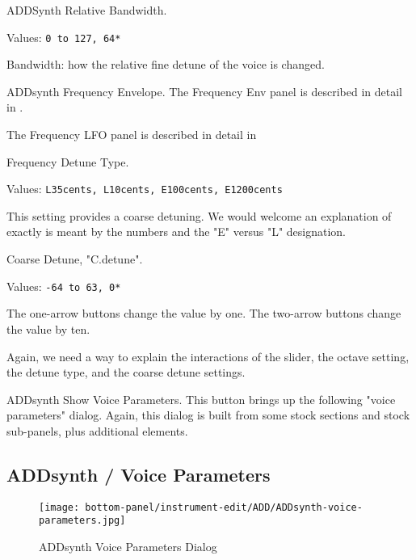    ADDSynth Relative Bandwidth.

   Values: \texttt{0 to 127, 64*}

   Bandwidth: how the relative fine detune of the voice is changed.

   ADDsynth Frequency Envelope.
   The Frequency Env panel is described in detail in
   .

   The Frequency LFO panel is described in detail in

   Frequency Detune Type.

   Values: \texttt{L35cents, L10cents, E100cents, E1200cents}

   This setting provides a coarse detuning.
   We would welcome an explanation of exactly is meant by the numbers and
   the "E" versus "L" designation.

   Coarse Detune, "C.detune".

   Values: \texttt{-64 to 63, 0*}

   The one-arrow buttons change the value by one.
   The two-arrow buttons change the value by ten.

   Again, we need a way to explain the interactions of the slider, the
   octave setting, the detune type, and the coarse detune settings.

   ADDsynth Show Voice Parameters.
   This button brings up the following "voice parameters" dialog.
   Again, this dialog is built from some stock sections and stock
   sub-panels, plus additional elements.

\subsection{ADDsynth / Voice Parameters}
\label{subsec:addsynth_voice_parameters}

\begin{figure}[H]
   \centering 
   \texttt{[image: bottom-panel/instrument-edit/ADD/ADDsynth-voice-parameters.jpg]}
   \caption{ADDsynth Voice Parameters Dialog}
   \label{fig:addsynth_voice_parameters_dialog}
\end{figure}

